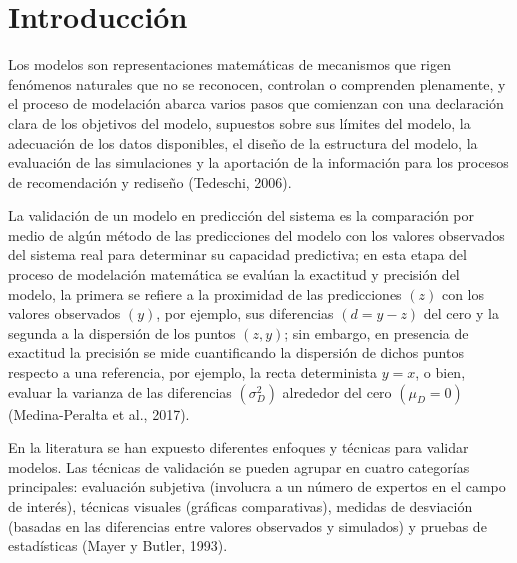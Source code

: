 \section{Introducción}
Los modelos son representaciones matemáticas de mecanismos que rigen fenómenos naturales que no se reconocen, controlan o comprenden plenamente, y el proceso de modelación abarca varios pasos que comienzan con una declaración clara de los objetivos del modelo, supuestos sobre sus límites del modelo, la adecuación de los datos disponibles, el diseño de la estructura del modelo, la evaluación de las simulaciones y la aportación de la información para los procesos de recomendación y rediseño (Tedeschi, 2006).
\vspace{.5cm}
 
La validación de un modelo en predicción del sistema es la comparación por medio de algún método de las predicciones del modelo con los valores observados del sistema real para determinar su capacidad predictiva; en esta etapa del proceso de modelación matemática se evalúan la exactitud y precisión del modelo, la primera se refiere a la proximidad de las predicciones $( z )$ con los valores observados $( y )$, por ejemplo, sus diferencias $ ( d=y-z ) $ del cero y la segunda a la dispersión de los puntos $ (z, y) $; sin embargo, en presencia de exactitud la precisión se mide cuantificando la dispersión de dichos puntos respecto a una referencia, por ejemplo, la recta determinista $ y=x $, o bien, evaluar la varianza de las diferencias $ (\sigma_{D}^{2}) $ alrededor del cero $ (\mu_{D}=0) $ (Medina-Peralta et al., 2017).
\vspace{.5cm}
 
En la literatura se han expuesto diferentes enfoques y técnicas para validar modelos. Las técnicas de validación se pueden agrupar en cuatro categorías principales: evaluación subjetiva (involucra a un número de expertos en el campo de interés), técnicas visuales (gráficas comparativas), medidas de desviación (basadas en las diferencias entre valores observados y simulados) y pruebas de estadísticas (Mayer y Butler, 1993).
\vspace{.5cm}
 
